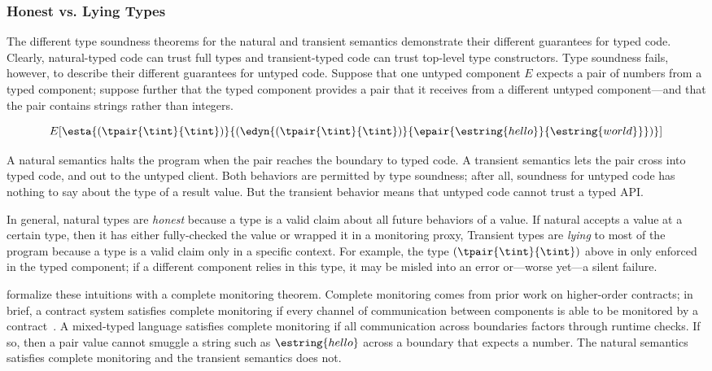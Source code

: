 \subsubsection{Honest vs. Lying Types}

The different type soundness theorems for the natural and transient semantics
 demonstrate their different guarantees for typed code.
Clearly, natural-typed code can trust full types and transient-typed code
 can trust top-level type constructors.
Type soundness fails, however, to describe their different guarantees for
 untyped code.
Suppose that one untyped component $E$ expects a pair of numbers from a
 typed component;
 suppose further that the typed component provides a pair that it receives
 from a different untyped component---and that the pair contains strings
 rather than integers.

\[
  E[\esta{(\tpair{\tint}{\tint})}{(\edyn{(\tpair{\tint}{\tint})}{\epair{\estring{hello}}{\estring{world}}})}]
\]

\noindent
A natural semantics halts the program when the pair reaches the boundary to
 typed code.
A transient semantics lets the pair cross into typed code, and out to the
 untyped client.
Both behaviors are permitted by type soundness;
 after all, soundness for untyped code has nothing to say about the type of a
 result value.
But the transient behavior means that untyped code cannot trust a typed
 API.

In general, natural types are \emph{honest}\/ because a type is a valid
 claim about all future behaviors of a value.
If natural accepts a value at a certain type, then it has either fully-checked
 the value or wrapped it in a monitoring proxy,
Transient types are \emph{lying}\/ to most of the program because a type is
 a valid claim only in a specific context.
For example, the type $(\tpair{\tint}{\tint})$ above in only enforced in
 the typed component; if a different component relies in this type, it
 may be misled into an error or---worse yet---a silent failure.

\citet{gfd-oopsla-2019} formalize these intuitions with a complete
 monitoring theorem.
Complete monitoring comes from prior work on higher-order contracts;
 in brief, a contract system satisfies complete monitoring if every channel
 of communication between components is able to be monitored
 by a contract~\cite{dtf-esop-2012}.
A mixed-typed language satisfies complete monitoring if all communication
 across boundaries factors through runtime checks.
If so, then a pair value cannot smuggle a string such as $\estring{hello}$
 across a boundary that expects a number.
The natural semantics satisfies complete monitoring and the transient
 semantics does not.


